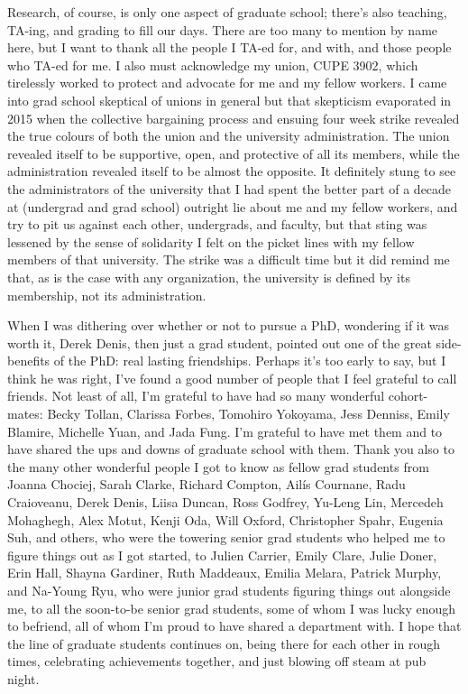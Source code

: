 \documentclass[
	12pt,
	twoside,
	narrowmargins
	]{ut-thesis}
\theoremstyle{definition}
\begin{document}
\begin{preliminary}
\begin{acknowledgements}
	  Research, of course, is only one aspect of graduate school; there's also teaching, TA-ing, and grading to fill our days.
	  There are too many to mention by name here, but I want to thank all the people I TA-ed for, and with, and those people who TA-ed for me.
	  I also must acknowledge my union, CUPE 3902, which tirelessly worked to protect and advocate for me and my fellow workers.
	  I came into grad school skeptical of unions in general but that skepticism evaporated in 2015 when the collective bargaining process and ensuing four week strike revealed the true colours of both the union and the university administration.
	  The union revealed itself to be supportive, open, and protective of all its members, while the administration revealed itself to be almost the opposite.
	  It definitely stung to see the administrators of the university that I had spent the better part of a decade at (undergrad and grad school) outright lie about me and my fellow workers, and try to pit us against each other, undergrads, and faculty, but that sting was lessened by the sense of solidarity I felt on the picket lines with my fellow members of that university.
	  The strike was a difficult time but it did remind me that, as is the case with any organization, the university is defined by its membership, not its administration.

	  When I was dithering over whether or not to pursue a PhD, wondering if it was worth it, Derek Denis, then just a grad student, pointed out one of the great side-benefits of the PhD: real lasting friendships.
	  Perhaps it's too early to say, but I think he was right, I've found a good number of people that I feel grateful to call friends.
	  Not least of all, I'm grateful to have had so many wonderful cohort-mates: Becky Tollan, Clarissa Forbes, Tomohiro Yokoyama, Jess Denniss, Emily Blamire, Michelle Yuan, and Jada Fung.
	  I'm grateful to have met them and to have shared the ups and downs of graduate school with them.
	  Thank you also to the many other wonderful people I got to know as fellow grad students from Joanna Chociej, Sarah Clarke, Richard Compton, Ail\'is Cournane, Radu Craioveanu, Derek Denis, Liisa Duncan, Ross Godfrey, Yu-Leng Lin, Mercedeh Mohaghegh, Alex Motut, Kenji Oda, Will Oxford, Christopher Spahr, Eugenia Suh, and others, who were the towering senior grad students who helped me to figure things out as I got started, to Julien Carrier, Emily Clare, Julie Doner, Erin Hall, Shayna Gardiner, Ruth Maddeaux, Emilia Melara, Patrick Murphy, and Na-Young Ryu, who were junior grad students figuring things out alongside me, to all the soon-to-be senior grad students, some of whom I was lucky enough to befriend, all of whom I'm proud to have shared a department with.
	  I hope that the line of graduate students continues on, being there for each other in rough times, celebrating achievements together, and just blowing off steam at pub night.


\end{acknowledgements}
\end{preliminary}
\end{document}
